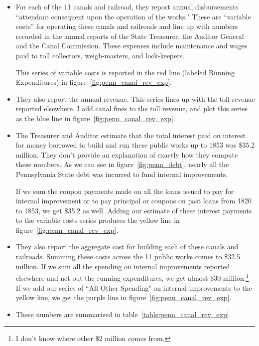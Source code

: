 \documentclass[11pt]{article}
\begin{document}
\begin{itemize}
\begin{itemize}
\item For each of the 11 canals and railroad, they report annual 
disbursements ``attendant consequent upon the operation of the works." These 
are ``variable costs'' for operating these canals and railroads and line up 
with numbers recorded in the annual reports of the State Treasurer, the Auditor 
General and the Canal Commission.  These expenses include maintenance and wages 
paid to toll collectors, weigh-masters, and lock-keepers.

This series of variable costs is reported in the red line (labeled Running 
Expenditures) in figure~\ref{fig:penn_canal_rev_exp}.

\item They also report the annual revenue.  This series lines up with the 
toll revenue reported elsewhere. I add canal fines to the toll revenue, 
and plot this series as the blue line in 
figure~\ref{fig:penn_canal_rev_exp}.  

\item The Treasurer and Auditor estimate that the total interest paid on 
interest for money borrowed to build and run these public works up to 1853 
was \$35.2 million.  They don't provide an explanation of exactly how they 
compute these numbers.  As we can see in figure~\ref{fig:penn_debt}, nearly
all the Pennsylvania State debt was 
incurred to fund internal improvements.  

If we sum the coupon payments made on all the loans issued to pay for internal improvement 
or to pay principal or coupons on past loans from 1820 to 1853, we get 
\$35.2 as well.  Adding our estimate of these interest payments 
to the variable costs series produces the yellow line in 
figure~\ref{fig:penn_canal_rev_exp}.

\item They also report the aggregate cost for building each of these canals 
and railroads.  Summing these costs across the 11 public works comes to 
\$32.5 million.  If we sum all the spending on internal improvements reported 
elsewhere and net out the running expenditures, we get almost \$30 
million.\footnote{I don't know where other \$2 million comes from.}
If we add our series of ``All 
Other Spending" on internal improvements to the yellow line, we get the purple 
line in figure~\ref{fig:penn_canal_rev_exp}.

\item These numbers are summarized in table~\ref{table:penn_canal_rev_exp}.

\end{itemize}


\end{itemize}
\end{document}
